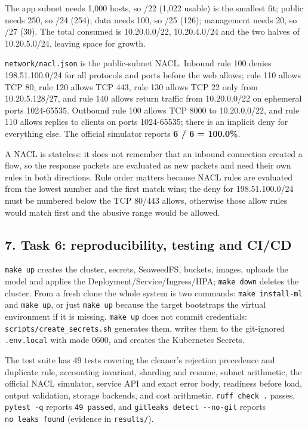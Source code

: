\documentclass[
]{article}
\begin{document}
The app subnet needs 1,000 hosts, so /22 (1,022 usable) is the smallest
fit; public needs 250, so /24 (254); data needs 100, so /25 (126);
management needs 20, so /27 (30). The total consumed is 10.20.0.0/22,
10.20.4.0/24 and the two halves of 10.20.5.0/24, leaving space for
growth.

\texttt{network/nacl.json} is the public-subnet NACL. Inbound rule 100
denies 198.51.100.0/24 for all protocols and ports before the web
allows; rule 110 allows TCP 80, rule 120 allows TCP 443, rule 130 allows
TCP 22 only from 10.20.5.128/27, and rule 140 allows return traffic from
10.20.0.0/22 on ephemeral ports 1024-65535. Outbound rule 100 allows TCP
8000 to 10.20.0.0/22, and rule 110 allows replies to clients on ports
1024-65535; there is an implicit deny for everything else. The official
simulator reports \textbf{6 / 6 = 100.0\%}.

A NACL is stateless: it does not remember that an inbound connection
created a flow, so the response packets are evaluated as new packets and
need their own rules in both directions. Rule order matters because NACL
rules are evaluated from the lowest number and the first match wins; the
deny for 198.51.100.0/24 must be numbered below the TCP 80/443 allows,
otherwise those allow rules would match first and the abusive range
would be allowed.

\hypertarget{task-6-reproducibility-testing-and-cicd}{%
\subsection{7. Task 6: reproducibility, testing and
CI/CD}\label{task-6-reproducibility-testing-and-cicd}}

\texttt{make\ up} creates the cluster, secrets, SeaweedFS, buckets,
images, uploads the model and applies the
Deployment/Service/Ingress/HPA; \texttt{make\ down} deletes the cluster.
From a fresh clone the whole system is two commands:
\texttt{make\ install-ml} and \texttt{make\ up}, or just
\texttt{make\ up} because the target bootstraps the virtual environment
if it is missing. \texttt{make\ up} does not commit credentials:
\texttt{scripts/create\_secrets.sh} generates them, writes them to the
git-ignored \texttt{.env.local} with mode 0600, and creates the
Kubernetes Secrets.

The test suite has 49 tests covering the cleaner's rejection precedence
and duplicate rule, accounting invariant, sharding and resume, subnet
arithmetic, the official NACL simulator, service API and exact error
body, readiness before load, output validation, storage backends, and
cost arithmetic. \texttt{ruff\ check\ .} passes, \texttt{pytest\ -q}
reports \texttt{49\ passed}, and \texttt{gitleaks\ detect\ -\/-no-git}
reports \texttt{no\ leaks\ found} (evidence in \texttt{results/}).
\end{document}
